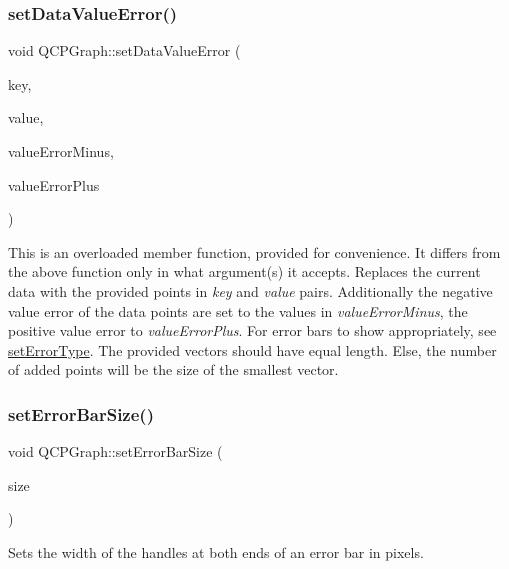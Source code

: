 \subsubsection{\texorpdfstring{set\+Data\+Value\+Error()}{setDataValueError()}\hspace{0.1cm}{\footnotesize\ttfamily [2/2]}}
{\footnotesize\ttfamily void Q\+C\+P\+Graph\+::set\+Data\+Value\+Error (\begin{DoxyParamCaption}\item[{const Q\+Vector$<$ double $>$ \&}]{key,  }\item[{const Q\+Vector$<$ double $>$ \&}]{value,  }\item[{const Q\+Vector$<$ double $>$ \&}]{value\+Error\+Minus,  }\item[{const Q\+Vector$<$ double $>$ \&}]{value\+Error\+Plus }\end{DoxyParamCaption})}

This is an overloaded member function, provided for convenience. It differs from the above function only in what argument(s) it accepts. Replaces the current data with the provided points in {\itshape key} and {\itshape value} pairs. Additionally the negative value error of the data points are set to the values in {\itshape value\+Error\+Minus}, the positive value error to {\itshape value\+Error\+Plus}. For error bars to show appropriately, see \mbox{\hyperlink{class_q_c_p_graph_ac3614d799c3894f2bc646e99c7f73d38}{set\+Error\+Type}}. The provided vectors should have equal length. Else, the number of added points will be the size of the smallest vector. \mbox{\label{class_q_c_p_graph_a10f50c5495ce45ef559ec2066194a335}} 
\subsubsection{\texorpdfstring{set\+Error\+Bar\+Size()}{setErrorBarSize()}}
{\footnotesize\ttfamily void Q\+C\+P\+Graph\+::set\+Error\+Bar\+Size (\begin{DoxyParamCaption}\item[{double}]{size }\end{DoxyParamCaption})}

Sets the width of the handles at both ends of an error bar in pixels. \mbox{\label{class_q_c_p_graph_ab1c1ee03d8dd94676a564e5e5f11aac2}} 
